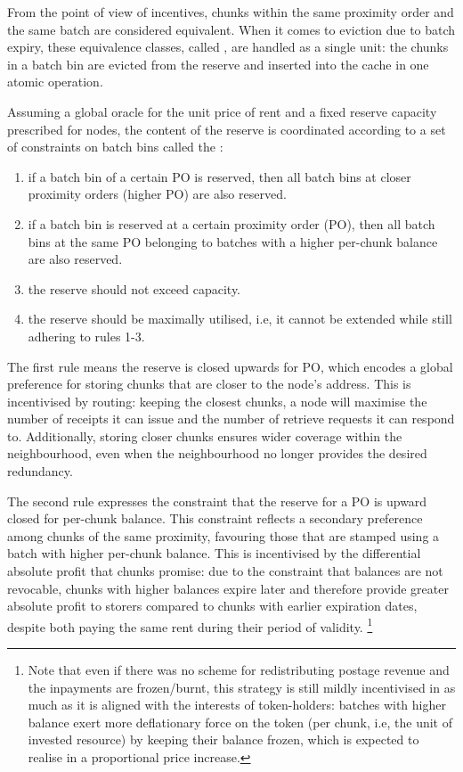From the point of view of incentives, chunks within the same proximity order and the same batch are considered equivalent. When it comes to eviction due to batch expiry, these equivalence classes, called , are handled as a single unit: the chunks in a batch bin are evicted from the reserve and inserted into the cache in one atomic operation. 

Assuming a global oracle for the unit price of rent and a fixed reserve capacity prescribed for nodes, the content of the reserve is coordinated according to a set of constraints on batch bins called the :
\begin{enumerate}
    \item if a batch bin of a certain PO is reserved, then all batch bins at closer proximity orders (higher PO) are also reserved. 
    \item if a batch bin is reserved at a certain proximity order (PO), then all batch bins at the same PO belonging to batches with a higher per-chunk balance are also reserved. 
    \item the reserve should not exceed capacity.
    \item the reserve should be maximally utilised, i.e, it cannot be extended while still adhering to rules 1-3.
\end{enumerate}

The first rule means the reserve is closed upwards for PO, which encodes a global preference for  storing chunks that are closer to the node's address. This is incentivised by routing: keeping the closest chunks, a node will maximise the number of receipts it can issue and the number of retrieve requests it can respond to. Additionally, storing closer chunks ensures wider coverage within the neighbourhood, even when the neighbourhood no longer provides the desired redundancy.

The second rule expresses the constraint that the reserve for a PO is upward closed for per-chunk balance. This constraint reflects a secondary preference among chunks of the same proximity, favouring those that are stamped using a batch with higher per-chunk balance. This is incentivised by the differential absolute profit that chunks promise: due to the constraint that balances are not revocable, chunks with higher balances expire later and therefore provide greater absolute profit to storers compared to chunks with earlier expiration dates, despite both paying the same rent during their period of validity.%
%
\footnote{Note that even if there was no scheme for redistributing postage revenue and the inpayments are frozen/burnt, this strategy is still mildly incentivised in as much as it is aligned with the interests of token-holders: batches with higher balance exert more deflationary force on the token (per chunk, i.e, the unit of invested resource) by keeping their balance frozen, which is expected to realise in a proportional price increase.}


